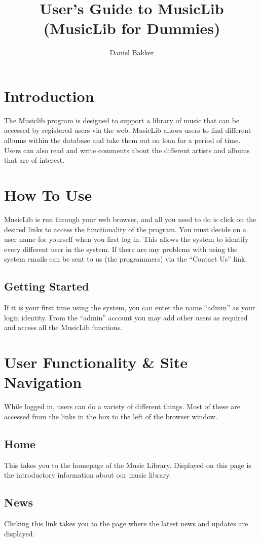\documentclass{article}
\title{User's Guide to MusicLib (MusicLib for Dummies)}
\author{Daniel Bakker}
\begin{document}
\maketitle
\tableofcontents

\section{Introduction}
The Musiclib program is designed to support a library of music that can be accessed by registered users via the web. MusicLib allows users to find different albums within the database and take them out on loan for a period of time. Users can also read and write comments about the different artists and albums that are of interest.

\section{How To Use}
MusicLib is run through your web browser, and all you need to do is click on the desired links to access the functionality of the program. You must decide on a user name for yourself when you first log in. This allows the system to identify every different user in the system. If there are any problems with using the system emails can be sent to us (the programmers) via the ``Contact Us'' link. 
\subsection{Getting Started}
If it is your first time using the system, you can enter the name ``admin'' as your login identity. From the ``admin'' account you may add other users as required and access all the MusicLib functions. 

\section{User Functionality \& Site Navigation}
While logged in, users can do a variety of different things. Most of these are accessed from the links in the box to the left of the browser window.
\subsection{Home}
This takes you to the homepage of the Music Library. Displayed on this page is the introductory information about our music library.
\subsection{News}
Clicking this link takes you to the page where the latest news and updates are displayed.
\end{document}
